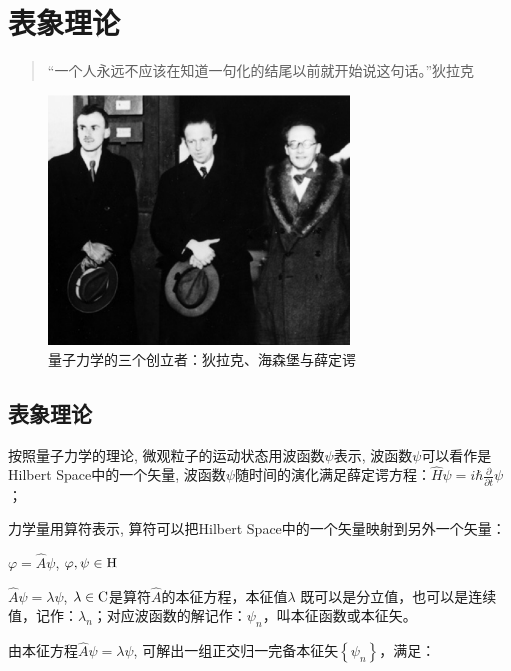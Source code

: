 \section{表象理论}

\begin{quotation}
``一个人永远不应该在知道一句化的结尾以前就开始说这句话。''\qquad 狄拉克
\end{quotation}

\begin{figure}[h]
\begin{center}
\includegraphics[clip,width=8cm]{Representations/1933nobel.ps}
\caption{量子力学的三个创立者：狄拉克、海森堡与薛定谔}
\end{center}
\end{figure}


\subsection{表象理论}


按照量子力学的理论, 微观粒子的运动状态用波函数$\psi$表示,
波函数$\psi$可以看作是Hilbert Space中的一个矢量,
波函数$\psi$随时间的演化满足薛定谔方程：$\widehat H\psi  = i\hbar
\frac{\partial }{{\partial t}}\psi $；

力学量用算符表示, 算符可以把Hilbert
Space中的一个矢量映射到另外一个矢量：

\begin{center}
$\varphi  = \widehat A\psi $, $\varphi ,\psi  \in {\rm{H}}$
\end{center}

$\widehat A\psi  = \lambda \psi $, $\lambda  \in {\rm{C}}$是算符$\hat A$的本征方程，本征值$\lambda$ 既可以是分立值，也可以是连续值，记作：$\lambda _n$；对应波函数的解记作：$\psi _n$，叫本征函数或本征矢。

由本征方程$\widehat A\psi  = \lambda \psi $,
可解出一组正交归一完备本征矢$\left\{ {\psi _n } \right\}$，满足：

